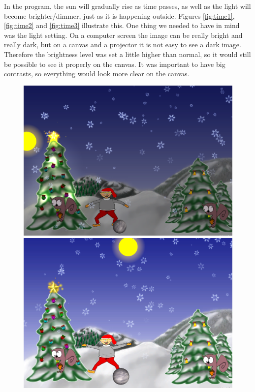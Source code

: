 In the program, the sun will gradually rise as time passes, as well as the light will become brighter/dimmer, just as it is happening outside. Figures \ref{fig:time1}, \ref{fig:time2} and \ref{fig:time3} illustrate this. One thing we needed to have in mind was the light setting. On a computer screen the image can be really bright and really dark, but on a canvas and a projector it is not easy to see a dark image. Therefore the brightness level was set a little higher than normal, so it would still be possible to see it properly on the canvas. It was important to have big contrasts, so everything would look more clear on the canvas.

\begin{figure}[htbp]\centering
	\begin{minipage}[b]{0.3\textwidth}\centering
		\includegraphics[width=1.00\textwidth]{Pictures/Design/time1.png} %
	\end{minipage}\hfill
	\begin{minipage}[b]{0.3\textwidth}\centering
		\includegraphics[width=1.00\textwidth]{Pictures/Design/time2.png} %

\end{minipage}
\end{figure}
